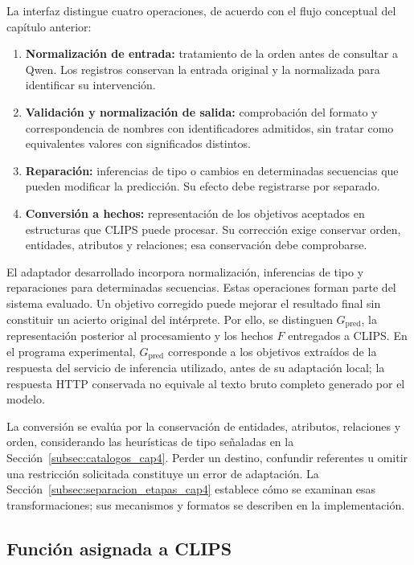 La interfaz distingue cuatro operaciones, de acuerdo con el flujo conceptual del capítulo anterior:

\begin{enumerate}
    \item \textbf{Normalización de entrada:} tratamiento de la orden antes de consultar a Qwen. Los registros conservan la entrada original y la normalizada para identificar su intervención.
    \item \textbf{Validación y normalización de salida:} comprobación del formato y correspondencia de nombres con identificadores admitidos, sin tratar como equivalentes valores con significados distintos.
    \item \textbf{Reparación:} inferencias de tipo o cambios en determinadas secuencias que pueden modificar la predicción. Su efecto debe registrarse por separado.
    \item \textbf{Conversión a hechos:} representación de los objetivos aceptados en estructuras que CLIPS puede procesar. Su corrección exige conservar orden, entidades, atributos y relaciones; esa conservación debe comprobarse.
\end{enumerate}

El adaptador desarrollado incorpora normalización, inferencias de tipo y reparaciones para determinadas secuencias. Estas operaciones forman parte del sistema evaluado. Un objetivo corregido puede mejorar el resultado final sin constituir un acierto original del intérprete. Por ello, se distinguen $G_{\mathrm{pred}}$, la representación posterior al procesamiento y los hechos $F$ entregados a CLIPS. En el programa experimental, $G_{\mathrm{pred}}$ corresponde a los objetivos extraídos de la respuesta del servicio de inferencia utilizado, antes de su adaptación local; la respuesta HTTP conservada no equivale al texto bruto completo generado por el modelo.

La conversión se evalúa por la conservación de entidades, atributos, relaciones y orden, considerando las heurísticas de tipo señaladas en la Sección~\ref{subsec:catalogos_cap4}. Perder un destino, confundir referentes u omitir una restricción solicitada constituye un error de adaptación. La Sección~\ref{subsec:separacion_etapas_cap4} establece cómo se examinan esas transformaciones; sus mecanismos y formatos se describen en la implementación.


\subsection{Función asignada a CLIPS}

